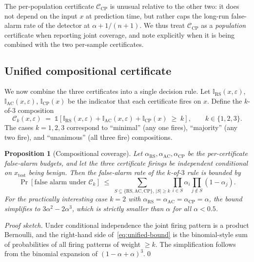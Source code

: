\documentclass[journal,twoside]{IEEEtran}
\newtheorem{proposition}[theorem]{Proposition}
\begin{document}
The per-population certificate $\mathcal{C}_{\mathrm{CP}}$ is unusual
relative to the other two: it does not depend on the input $x$ at
prediction time, but rather caps the long-run false-alarm rate of the
detector at $\alpha + 1/(n+1)$. We thus treat $\mathcal{C}_{\mathrm{CP}}$
as a \emph{population} certificate when reporting joint coverage, and
note explicitly when it is being combined with the two per-sample
certificates.

\subsection{Unified compositional certificate}\label{sec:unified}

We now combine the three certificates into a single decision rule. Let
$\mathbb{I}_{\mathrm{RS}}(x,\varepsilon)$, $\mathbb{I}_{\mathrm{AC}}(x,\varepsilon)$,
$\mathbb{I}_{\mathrm{CP}}(x)$ be the indicator that each certificate
fires on $x$. Define the $k$-of-$3$ composition
\begin{equation}
\label{eq:kof3}
\mathcal{C}_k(x,\varepsilon) \;=\;
\mathbb{1}\!\left[
\mathbb{I}_{\mathrm{RS}}(x,\varepsilon) +
\mathbb{I}_{\mathrm{AC}}(x,\varepsilon) +
\mathbb{I}_{\mathrm{CP}}(x) \;\ge\; k
\right],
\qquad k \in \{1,2,3\}.
\end{equation}
The cases $k=1,2,3$ correspond to ``minimal'' (any one fires),
``majority'' (any two fire), and ``unanimous'' (all three fire)
compositions.

\begin{proposition}[Compositional coverage]
\label{prop:unified}
Let $\alpha_{\mathrm{RS}}, \alpha_{\mathrm{AC}}, \alpha_{\mathrm{CP}}$
be the per-certificate false-alarm budgets, and let the three
certificate firings be \emph{independent} conditional on
$x_{\mathrm{test}}$ being benign. Then the false-alarm rate of the
$k$-of-$3$ rule is bounded by
\begin{equation}
\label{eq:unified-bound}
\Pr[\text{false alarm under } \mathcal{C}_k] \;\le\;
\sum_{S \subseteq \{\mathrm{RS,AC,CP}\},\,|S|\ge k}
\prod_{i \in S} \alpha_i
\prod_{j \notin S} (1-\alpha_j).
\end{equation}
For the practically interesting case $k=2$ with
$\alpha_{\mathrm{RS}}=\alpha_{\mathrm{AC}}=\alpha_{\mathrm{CP}}=\alpha$,
the bound simplifies to $3\alpha^2 - 2\alpha^3$, which is strictly
smaller than $\alpha$ for all $\alpha < 0.5$.
\end{proposition}

\emph{Proof sketch.} Under conditional independence the joint firing
pattern is a product Bernoulli, and the right-hand side
of~\eqref{eq:unified-bound} is the binomial-style sum of probabilities
of all firing patterns of weight $\ge k$. The simplification follows
from the binomial expansion of $(1-\alpha + \alpha)^3$.\qed
\end{document}
